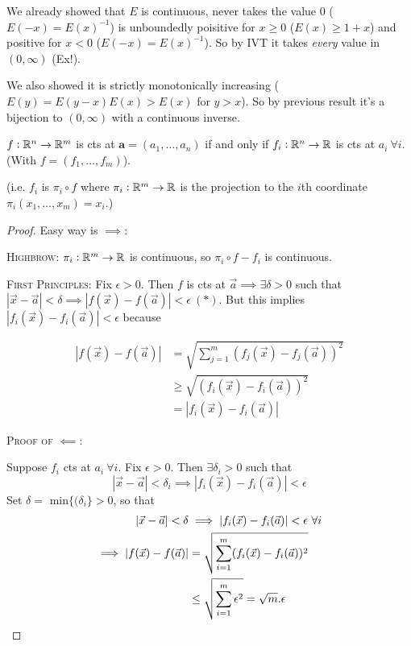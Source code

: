 \documentclass[10pt,twoside]{scrartcl}
\begin{document}
We already showed that $E$ is continuous, never takes the value $0$ ($E(-x) = E(x)^{-1}$) is unboundedly poisitive for $x \geq 0$ ($E(x) \geq 1 + x$) and positive for $x < 0$ ($E(-x) = E(x)^{-1}$). So by IVT it takes \emph{every} value in $(0,\infty)$ (Ex!). 

We also showed it is strictly monotonically increasing ($E(y) = E(y-x)E(x) > E(x)$ for $y > x$). So by previous result it's a bijection to $(0,\infty)$ with a continuous inverse.\\


\begin{theorem}
	$f:\mathbb{R}^n \to \mathbb{R}^m$ is cts at $\mathbf{a} = (a_1,\dots,a_n)$ if and only if $f_i:\mathbb{R}^n \to \mathbb{R}$ is cts at $a_i~\forall i$. (With $f = (f_1,\dots,f_m)$).
\end{theorem}

(i.e. $f_i$ is $\pi_i \circ f$ where $\pi_i: \mathbb{R}^m \to \mathbb{R}$ is the projection to the $i$th coordinate $\pi_i(x_1,\dots,x_m) = x_i$.)

\begin{proof}

Easy way is $\implies$:

\textsc{Highbrow:} $\pi_i: \mathbb{R}^m \to \mathbb{R}$ is continuous, so $\pi_i \circ f - f_i$ is continuous.

\textsc{First Principles:}
	Fix $\epsilon >0.$ Then $f$ is cts at $\vec{a} \implies \exists \delta >0 $ such that $|\vec{x} - \vec{a}| < \delta  \implies |f(\vec{x}) - f(\vec{a})| < \epsilon ~(*)$. But this implies $|f_i(\vec{x}) - f_i(\vec{a})| < \epsilon$ because
	
\begin{align*}
|f(\vec{x}) - f(\vec{a})| &= \sqrt{\sum_{j=1}^m (f_j(\vec{x}) - f_j(\vec{a}))^2}\\
&\geq \sqrt{(f_i(\vec{x}) - f_i(\vec{a}))^2}\\
&= |f_i(\vec{x}) - f_i(\vec{a})| 	
\end{align*}

\textsc{Proof of $\impliedby$:}

	Suppose $f_i$ cts at $a_i~\forall i$. Fix $\epsilon > 0$. Then $\exists \delta_i > 0$ such that \[|\vec{x} - \vec{a}| < \delta_i \implies |f_i(\vec{x}) - f_i(\vec{a})| < \epsilon\]
	 Set $\delta =$ min$\{(\delta_i\} >0$, so that 
	 \begin{align*}|\vec{x} - \vec{a}| < \delta &\implies |f_i(\vec{x}) - f_i(\vec{a})| < \epsilon ~\forall i\\
	  \implies |f(\vec{x}) - f(\vec{a})| &= \sqrt{\sum_{i=1}^m (f_i(\vec{x}) - f_i(\vec{a}))^2} \\
	  &\leq \sqrt{\sum_{i=1}^m \epsilon^2} = \sqrt{m}.\epsilon	\qedhere
\end{align*}
\end{proof}
\end{document}
